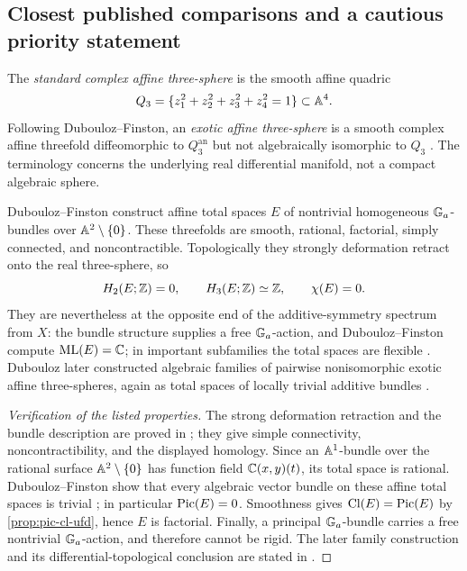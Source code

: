 \subsection{Closest published comparisons and a cautious priority statement}\label{subsec:closest-comparisons}

\begin{definition}\label{def:exotic-affine-three-sphere}
The \emph{standard complex affine three-sphere} is the smooth affine quadric
\[
  Q_3=\{z_1^2+z_2^2+z_3^2+z_4^2=1\}\subset\mathbb A^4.
\]
Following Dubouloz--Finston, an \emph{exotic affine three-sphere} is a smooth complex affine threefold diffeomorphic to $Q_3^{\mathrm{an}}$ but not algebraically isomorphic to $Q_3$ \cite{DuboulozFinston2014}.  The terminology concerns the underlying real differential manifold, not a compact algebraic sphere.
\end{definition}

\begin{historicalnote}\label{hist:exotic-affine-three-spheres}
Dubouloz--Finston construct affine total spaces $E$ of nontrivial homogeneous $\mathbb G_a$-bundles over $\mathbb A^2\setminus\{0\}$.  These threefolds are smooth, rational, factorial, simply connected, and noncontractible.  Topologically they strongly deformation retract onto the real three-sphere, so
\[
  H_2(E;\mathbb Z)=0,
  \qquad
  H_3(E;\mathbb Z)\simeq\mathbb Z,
  \qquad
  \chi(E)=0.
\]
They are nevertheless at the opposite end of the additive-symmetry spectrum from $X$: the bundle structure supplies a free $\mathbb G_a$-action, and Dubouloz--Finston compute $\operatorname{ML}(E)=\mathbb C$; in important subfamilies the total spaces are flexible \cite[Introduction and Remark~1.4]{DuboulozFinston2014}.  Dubouloz later constructed algebraic families of pairwise nonisomorphic exotic affine three-spheres, again as total spaces of locally trivial additive bundles \cite{Dubouloz2018Families}.
\end{historicalnote}

\begin{proof}[Verification of the listed properties]
The strong deformation retraction and the bundle description are proved in \cite[Section~1]{DuboulozFinston2014}; they give simple connectivity, noncontractibility, and the displayed homology.  Since an $\mathbb A^1$-bundle over the rational surface $\mathbb A^2\setminus\{0\}$ has function field $\mathbb C(x,y)(t)$, its total space is rational.  Dubouloz--Finston show that every algebraic vector bundle on these affine total spaces is trivial \cite[Section~1.2, in the discussion preceding Remark~1.4]{DuboulozFinston2014}; in particular $\operatorname{Pic}(E)=0$.  Smoothness gives $\operatorname{Cl}(E)=\operatorname{Pic}(E)$ by \cref{prop:pic-cl-ufd}, hence $E$ is factorial.  Finally, a principal $\mathbb G_a$-bundle carries a free nontrivial $\mathbb G_a$-action, and therefore cannot be rigid.  The later family construction and its differential-topological conclusion are stated in \cite[Proposition~10]{Dubouloz2018Families}.
\end{proof}

